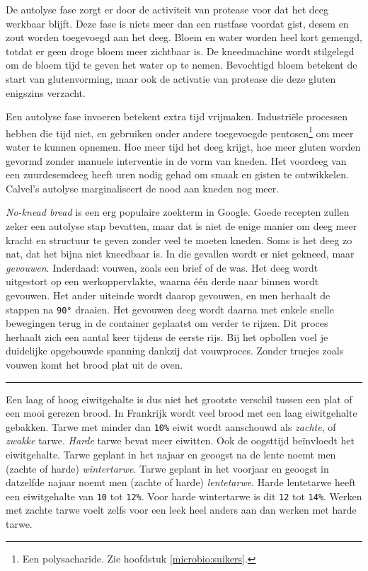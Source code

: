 \documentclass[
  11pt,
  dutch,
]{memoir}
\begin{document}
De autolyse fase zorgt er door de activiteit van protease voor dat het
deeg werkbaar blijft. Deze fase is niets meer dan een rustfase voordat
gist, desem en zout worden toegevoegd aan het deeg. Bloem en water
worden heel kort gemengd, totdat er geen droge bloem meer zichtbaar is.
De kneedmachine wordt stilgelegd om de bloem tijd te geven het water op
te nemen. Bevochtigd bloem betekent de start van glutenvorming, maar ook
de activatie van protease die deze gluten enigszins verzacht.

Een autolyse fase invoeren betekent extra tijd vrijmaken. Industriële
processen hebben die tijd niet, en gebruiken onder andere toegevoegde
pentosen\footnote{Een polysacharide. Zie hoofdstuk
  \ref{microbio:suikers}.} om meer water te kunnen opnemen. Hoe meer
tijd het deeg krijgt, hoe meer gluten worden gevormd zonder manuele
interventie in de vorm van kneden. Het voordeeg van een zuurdesemdeeg
heeft uren nodig gehad om smaak en gisten te ontwikkelen. Calvel's
autolyse marginaliseert de nood aan kneden nog meer.

\emph{No-knead bread} is een erg populaire zoekterm in Google. Goede
recepten zullen zeker een autolyse stap bevatten, maar dat is niet de
enige manier om deeg meer kracht en structuur te geven zonder veel te
moeten kneden. Soms is het deeg zo nat, dat het bijna niet kneedbaar is.
In die gevallen wordt er niet gekneed, maar \emph{gevouwen}. Inderdaad:
vouwen, zoals een brief of de was. Het deeg wordt uitgestort op een
werkoppervlakte, waarna één derde naar binnen wordt gevouwen. Het ander
uiteinde wordt daarop gevouwen, en men herhaalt de stappen na
\texttt{90°} draaien. Het gevouwen deeg wordt daarna met enkele snelle
bewegingen terug in de container geplaatst om verder te rijzen. Dit
proces herhaalt zich een aantal keer tijdens de eerste rijs. Bij het
opbollen voel je duidelijke opgebouwde spanning dankzij dat vouwproces.
Zonder trucjes zoals vouwen komt het brood plat uit de oven.

\pfbreak

Een laag of hoog eiwitgehalte is dus niet het grootste verschil tussen
een plat of een mooi gerezen brood. In Frankrijk wordt veel brood met
een laag eiwitgehalte gebakken. Tarwe met minder dan \texttt{10\%} eiwit
wordt aanschouwd als \emph{zachte}, of \emph{zwakke} tarwe. \emph{Harde}
tarwe bevat meer eiwitten. Ook de oogsttijd beïnvloedt het eiwitgehalte.
Tarwe geplant in het najaar en geoogst na de lente noemt men (zachte of
harde) \emph{wintertarwe}. Tarwe geplant in het voorjaar en geoogst in
datzelfde najaar noemt men (zachte of harde) \emph{lentetarwe}. Harde
lentetarwe heeft een eiwitgehalte van \texttt{10} tot \texttt{12\%}.
Voor harde wintertarwe is dit \texttt{12} tot \texttt{14\%}. Werken met
zachte tarwe voelt zelfs voor een leek heel anders aan dan werken met
harde tarwe.
\end{document}
